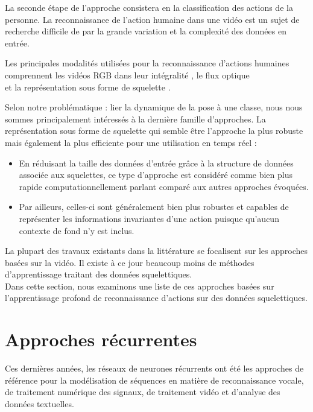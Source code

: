 La seconde étape de l'approche consistera en la classification des actions de la personne. La reconnaissance de l'action humaine dans une vidéo est un sujet de recherche difficile de par la grande variation et la complexité des données en entrée.

Les principales modalités utilisées pour la reconnaissance d'actions humaines comprennent les vidéos RGB dans leur intégralité \cite{donahue2015long,2014arXiv1412.0767T,varol2017long,Wu_2018_CVPR}, le flux optique \cite{simonyan2014two}\\\cite{zhang2016real}\cite{sevilla2018integration,DanutPOP} et la représentation sous forme de squelette \cite{vemulapalli2014human,du2015hierarchical,2016arXiv160707043L,2018arXiv180107455Y}.

Selon notre problématique : lier la dynamique de la pose à une classe, nous nous sommes principalement intéressés à la dernière famille d'approches. La représentation sous forme de squelette qui semble être l'approche la plus robuste mais également la plus efficiente pour une utilisation en temps réel :

\begin{itemize}
    \item En réduisant la taille des données d'entrée grâce à la structure de données associée aux squelettes, ce type d'approche est considéré comme bien plus rapide computationnellement parlant comparé aux autres approches évoquées.
    \item Par ailleurs, celles-ci sont généralement bien plus robustes et capables de représenter les informations invariantes d'une action puisque qu'aucun contexte de fond n'y est inclus.
\end{itemize}

La plupart des travaux existants dans la littérature se focalisent sur les approches basées sur la vidéo. Il existe à ce jour beaucoup moins de méthodes d'apprentissage traitant des données squelettiques.\\

Dans cette section, nous examinons une liste de ces approches basées sur l'apprentissage profond de reconnaissance d'actions sur des données squelettiques.

\section{Approches récurrentes}

Ces dernières années, les réseaux de neurones récurrents ont été les approches de référence pour la modélisation de séquences en matière de reconnaissance vocale, de traitement numérique des signaux, de traitement vidéo et d'analyse des données textuelles. 


